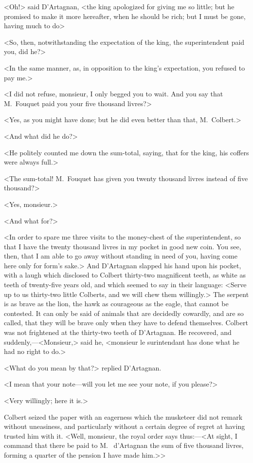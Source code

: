 <Oh!> said D'Artagnan, <the king apologized for giving me so little; but he promised to make it more hereafter, when he should be rich; but I must be gone, having much to do\longdash>

<So, then, notwithstanding the expectation of the king, the superintendent paid you, did he?>

<In the same manner, as, in opposition to the king's expectation, you refused to pay me.>

<I did not refuse, monsieur, I only begged you to wait. And you say that M.~Fouquet paid you your five thousand livres?>

<Yes, as you might have done; but he did even better than that, M.~Colbert.>

<And what did he do?>

<He politely counted me down the sum-total, saying, that for the king, his coffers were always full.>

<The sum-total! M.~Fouquet has given you twenty thousand livres instead of five thousand?>

<Yes, monsieur.>

<And what for?>

<In order to spare me three visits to the money-chest of the superintendent, so that I have the twenty thousand livres in my pocket in good new coin. You see, then, that I am able to go away without standing in need of you, having come here only for form's sake.> And D'Artagnan slapped his hand upon his pocket, with a laugh which disclosed to Colbert thirty-two magnificent teeth, as white as teeth of twenty-five years old, and which seemed to say in their language: <Serve up to us thirty-two little Colberts, and we will chew them willingly.> The serpent is as brave as the lion, the hawk as courageous as the eagle, that cannot be contested. It can only be said of animals that are decidedly cowardly, and are so called, that they will be brave only when they have to defend themselves. Colbert was not frightened at the thirty-two teeth of D'Artagnan. He recovered, and suddenly,—<Monsieur,> said he, <monsieur le surintendant has done what he had no right to do.>

<What do you mean by that?> replied D'Artagnan.

<I mean that your note—will you let me see your note, if you please?>

<Very willingly; here it is.>

Colbert seized the paper with an eagerness which the musketeer did not remark without uneasiness, and particularly without a certain degree of regret at having trusted him with it. <Well, monsieur, the royal order says thus:—<At sight, I command that there be paid to M.~ d'Artagnan the sum of five thousand livres, forming a quarter of the pension I have made him.>>

